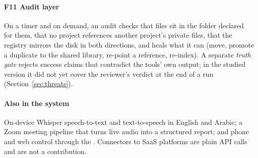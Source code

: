 \paragraph*{F11 Audit layer} On a timer and on demand, an audit checks that files sit in the folder declared for them, that no project references another project's private files, that the registry mirrors the disk in both directions, and heals what it can (move, promote a duplicate to the shared library, re-point a reference, re-index). A separate \emph{truth gate} rejects success claims that contradict the tools' own output; in the studied version it did not yet cover the reviewer's verdict at the end of a run (Section~\ref{sec:threats}).

\paragraph*{Also in the system} On-device Whisper speech-to-text and text-to-speech in English and Arabic; a Zoom meeting pipeline that turns live audio into a structured report; and phone and web control through the \hub. Connectors to SaaS platforms are plain API calls and are not a contribution.

